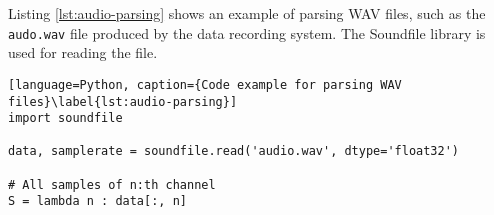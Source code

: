 Listing \ref{lst:audio-parsing} shows an example of parsing WAV files, such as the \texttt{audo.wav} file produced by the data recording system.
The Soundfile \cite{python-soundfile} library is used for reading the file.

\begin{lstlisting}[language=Python, caption={Code example for parsing WAV files}\label{lst:audio-parsing}]
import soundfile

data, samplerate = soundfile.read('audio.wav', dtype='float32')

# All samples of n:th channel
S = lambda n : data[:, n]
\end{lstlisting}